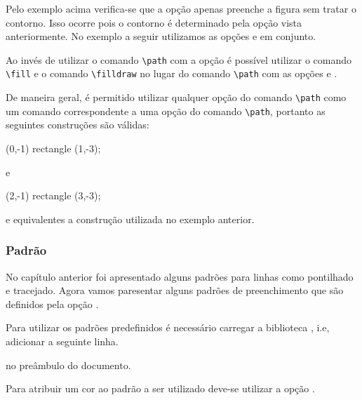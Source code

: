 Pelo exemplo acima verifica-se que a opção  apenas preenche a figura sem tratar o contorno. Isso ocorre pois o contorno é determinado pela opção  vista anteriormente. No exemplo a seguir utilizamos as opções  e  em conjunto. \\

Ao invés de utilizar o comando \lstinline!\path! com a opção  é possível utilizar o comando \lstinline!\fill! e o comando \lstinline!\filldraw! no lugar do comando \lstinline!\path! com as opções  e .

De maneira geral, é permitido utilizar qualquer opção do comando \lstinline!\path! como um comando correspondente a uma opção do comando \lstinline!\path!, portanto as seguintes construções são válidas:
\begin{code}
\fill[draw=red] (0,-1) rectangle (1,-3);
\end{code}
e
\begin{code}
\draw[fill=blue] (2,-1) rectangle (3,-3);
\end{code}
e equivalentes a construção utilizada no exemplo anterior.

\subsubsection{Padrão}
No capítulo anterior foi apresentado alguns padrões para linhas como pontilhado e tracejado. Agora vamos paresentar alguns padrões de preenchimento que são definidos pela opção .

Para utilizar os padrões predefinidos é necessário carregar a biblioteca , i.e, adicionar a seguinte linha.
\begin{code}
\usetikzlibrary{patterns}
\end{code}
no preâmbulo do documento. \\

Para atribuir um cor ao padrão a ser utilizado deve-se utilizar a opção . \\
